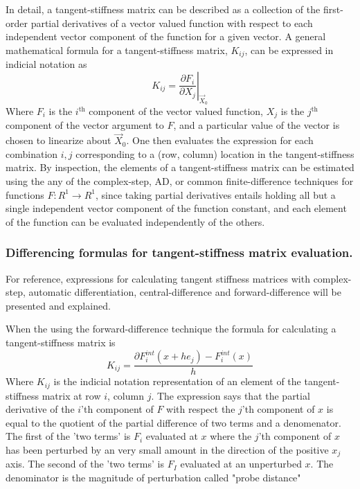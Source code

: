 \documentclass[preprint,12pt]{elsarticle}
\begin{document}
In detail, a tangent-stiffness matrix can be described as a collection of the first-order partial derivatives of a vector valued function with respect to each independent vector component of the function for a given vector.   A general mathematical formula for a tangent-stiffness matrix, $K_{ij}$,
can be expressed in indicial notation as 
%
\begin{equation} 
  K_{ij} = \left. \frac{\partial F_i}{\partial X_j}\right|_{\vec{X}_0}
\end{equation}
%
Where $F_i$ is the $i^{\mbox{th}}$ component of the vector valued function, $X_j$ is the $j^{\mbox{th}}$ component of the vector argument to $F$, and a particular value of the vector is chosen to linearize about $\vec{X}_0$. One then evaluates the expression for each combination $i, j$ corresponding to a (row, column) location in the tangent-stiffness matrix. By inspection, the elements of a tangent-stiffness matrix can be estimated using the any of the complex-step, AD, or common finite-difference techniques for functions $F:R^1 \rightarrow R^1$, since taking partial derivatives entails holding all but a single independent vector component of the function constant, and each element of the function can be evaluated independently of the others. \\ 

\subsubsection{Differencing formulas for tangent-stiffness matrix evaluation.}

For reference, expressions for calculating tangent stiffness matrices with complex-step, automatic differentiation, central-difference and forward-difference will be presented and explained. 

When the using the forward-difference technique the formula for calculating a tangent-stiffness
matrix is
%
\begin{equation} 
  K_{ij} = \frac{\partial F_i^{int}(x + h e_j) - F_i^{int}(x)}{h}
\end{equation}
%
Where $K_{ij}$ is the indicial notation representation of an element of the tangent-stiffness matrix at row $i$, column $j$. The expression says that the partial derivative of the $i$'th component of $F$ with respect the $j$'th component of $x$ is equal to the quotient of the partial difference of two terms
and a denomenator. The first of the 'two terms' is $F_i$ evaluated at $x$ where
the $j$'th component of $x$ has been perturbed by an very small amount in the direction of the
positive $x_j$ axis. The second of the 'two terms' is $F_I$ evaluated at an unperturbed $x$. The
denominator is the magnitude of perturbation called "probe distance" \cite{ref-Adaggio}
\end{document}
